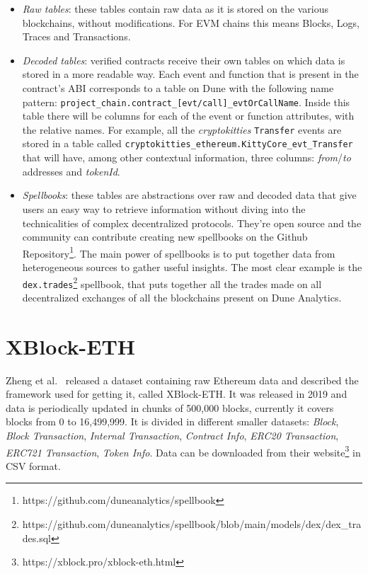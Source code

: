 \begin{itemize}
    \item \textit{Raw tables}: these tables contain raw data as it is stored on the various blockchains, without modifications. For EVM chains this means Blocks, Logs, Traces and Transactions.
    \item \textit{Decoded tables}: verified contracts receive their own tables on which data is stored in a more readable way. Each event and function that is present in the contract's ABI corresponds to a table on Dune with the following name pattern: \texttt{project\_chain.contract\_[evt/call]\_evtOrCallName}. Inside this table there will be columns for each of the event or function attributes, with the relative names. For example, all the \textit{cryptokitties} \texttt{Transfer} events are stored in a table called \texttt{cryptokitties\_ethereum.KittyCore\_evt\_Transfer} that will have, among other contextual information, three columns: \textit{from}/\textit{to} addresses and \textit{tokenId}.
    \item \textit{Spellbooks}: these tables are abstractions over raw and decoded data that give users an easy way to retrieve information without diving into the technicalities of complex decentralized protocols. They're open source and the community can contribute creating new spellbooks on the Github Repository\footnote{https://github.com/duneanalytics/spellbook}. The main power of spellbooks is to put together data from heterogeneous sources to gather useful insights. The most clear example is the \texttt{dex.trades}\footnote{https://github.com/duneanalytics/spellbook/blob/main/models/dex/dex\_trades.sql} spellbook, that puts together all the trades made on all decentralized exchanges of all the blockchains present on Dune Analytics.
\end{itemize}

\section{XBlock-ETH}

Zheng et al.~\cite{xblock-eth} released a dataset containing raw Ethereum data and described the framework used for getting it, called XBlock-ETH. It was released in 2019 and data is periodically updated in chunks of 500,000 blocks, currently it covers blocks from 0 to 16,499,999. It is divided in different smaller datasets: \textit{Block}, \textit{Block Transaction}, \textit{Internal Transaction}, \textit{Contract Info}, \textit{ERC20 Transaction}, \textit{ERC721 Transaction}, \textit{Token Info}. Data can be downloaded from their website\footnote{https://xblock.pro/xblock-eth.html} in CSV format.

